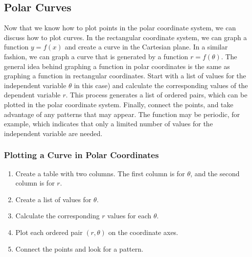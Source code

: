 \documentclass{report}
\begin{document}
    \pagebreak 
    \subsection{Polar Curves}
    \bigbreak \noindent 
    Now that we know how to plot points in the polar coordinate system, we can discuss how to plot curves. In the rectangular coordinate system, we can graph a function \( y = f(x) \) and create a curve in the Cartesian plane. In a similar fashion, we can graph a curve that is generated by a function \( r = f(\theta) \).
    \bigbreak \noindent 
    The general idea behind graphing a function in polar coordinates is the same as graphing a function in rectangular coordinates. Start with a list of values for the independent variable \( \theta \) in this case) and calculate the corresponding values of the dependent variable \( r \). This process generates a list of ordered pairs, which can be plotted in the polar coordinate system. Finally, connect the points, and take advantage of any patterns that may appear. The function may be periodic, for example, which indicates that only a limited number of values for the independent variable are needed.
    \bigbreak \noindent 
    \subsubsection{Plotting a Curve in Polar Coordinates}
    \begin{enumerate}
        \item Create a table with two columns. The first column is for \( \theta \), and the second column is for \( r \).
        \item Create a list of values for \( \theta \).
        \item Calculate the corresponding \( r \) values for each \( \theta \).
        \item Plot each ordered pair \( (r, \theta) \) on the coordinate axes.
        \item Connect the points and look for a pattern.
    \end{enumerate}
\end{document}

